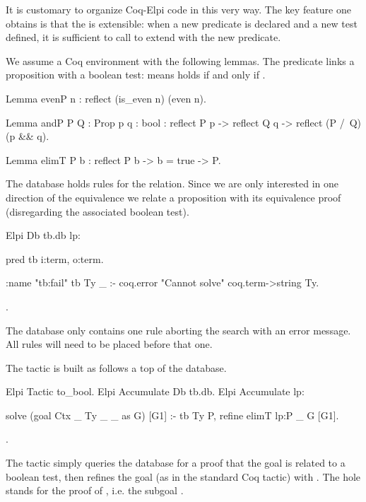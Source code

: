 \documentclass[a4paper, 11pt]{book}
\begin{document}
It is customary to organize Coq-Elpi code in this very way. The key feature
one obtains is that the  is extensible: when a new
predicate is declared and a new test defined, it is sufficient to call
 to extend  with the new
predicate.

We assume a Coq environment with the following lemmas. The 
predicate links a proposition with a boolean test: 
means  holds if and only if .

\begin{coqcode}
Lemma evenP n : reflect (is_even n) (even n).

Lemma andP  {P Q : Prop} {p q : bool} :
  reflect P p -> reflect Q q -> reflect (P /\ Q) (p && q).

Lemma elimT {P b} :
  reflect P b -> b = true -> P.
\end{coqcode}

The database holds rules for the  relation. Since
we are only interested in one direction of the equivalence we
relate a proposition with its equivalence proof (disregarding the
associated boolean test).

\begin{coqcode}
Elpi Db tb.db lp:{{

pred tb i:term, o:term.

:name "tb:fail"
tb Ty _ :- coq.error "Cannot solve" {coq.term->string Ty}.

}}.
\end{coqcode}

The database only contains one rule aborting the search with an error message.
All rules will need to be placed before that one.

The  tactic is built as follows a top of the
database.

\begin{coqcode}
Elpi Tactic to_bool.
Elpi Accumulate Db tb.db.
Elpi Accumulate lp:{{

solve (goal Ctx _ Ty _ _ as G) [G1] :-
  tb Ty P,
  refine {{ elimT lp:P _ }} G [G1].

}}.
\end{coqcode}

The tactic simply queries the database for a proof  that
the goal is related to a boolean test, then refines the goal (as in the
standard Coq  tactic) with .
The hole stands for the proof of , i.e. the subgoal
.
\end{document}
